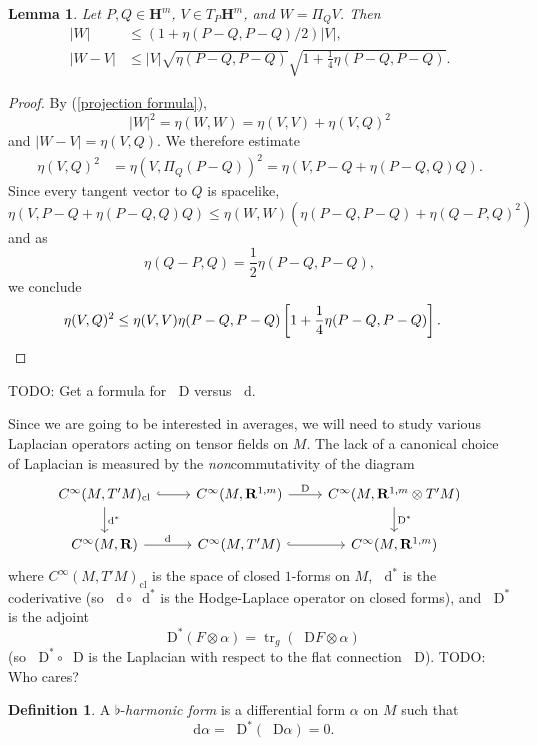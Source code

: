 \documentclass[reqno,12pt,letterpaper]{amsart}
\newcommand{\RR}{\mathbf{R}}
\newcommand{\Hyp}{\mathbf H}
\newcommand{\tr}{\operatorname{tr}}
\newcommand*\dif{\mathop{}\!\mathrm{d}}
\newcommand*\Dif{\mathop{}\!\mathrm{D}}
\newcommand{\dfn}[1]{\emph{#1}\index{#1}}
\newtheorem{lemma}[theorem]{Lemma}
\theoremstyle{definition}
\newtheorem{definition}[theorem]{Definition}
\numberwithin{equation}{section}
\begin{document}
\begin{lemma}
    Let $P, Q \in \Hyp^m$, $V \in T_P\Hyp^m$, and $W = \Pi_Q V$. Then
\begin{align*}
    |W| &\leq (1 + \eta(P - Q, P - Q)/2)|V|, \\
    |W - V| &\leq |V|\sqrt{\eta(P - Q, P - Q)} \sqrt{1 + \frac{1}{4} \eta(P - Q, P - Q)}.
\end{align*}
\end{lemma}
\begin{proof}
By (\ref{projection formula}),
$$|W|^2 = \eta(W, W) = \eta(V, V) + \eta(V, Q)^2$$
and $|W - V| = \eta(V, Q)$.
We therefore estimate 
\begin{align*}
\eta(V, Q)^2 &= \eta(V, \Pi_Q(P - Q))^2 = \eta(V, P - Q + \eta(P - Q, Q)Q).
\end{align*}
Since every tangent vector to $Q$ is spacelike,
$$\eta(V, P - Q + \eta(P - Q, Q)Q) \leq \eta(W, W)(\eta(P - Q, P - Q) + \eta(Q - P, Q)^2)$$
and as 
$$\eta(Q - P, Q) = \frac{1}{2}\eta(P - Q, P - Q),$$
we conclude 
\begin{align*}
\eta(V, Q)^2 &\leq \eta(V, V) \eta(P - Q, P - Q) \left[1 + \frac{1}{4} \eta(P - Q, P - Q)\right]. \qedhere
\end{align*}
\end{proof}

TODO: Get a formula for $\Dif$ versus $\dif$.

Since we are going to be interested in averages, we will need to study various Laplacian operators acting on tensor fields on $M$.
The lack of a canonical choice of Laplacian is measured by the \emph{non}commutativity of the diagram 
$$\begin{tikzcd}
C^\infty(M, T'M)_{\mathrm{cl}} \arrow[hookrightarrow]{r} \arrow["\dif^*"]{d} &
C^\infty(M, \RR^{1, m}) \arrow["\Dif"]{r} &
C^\infty(M, \RR^{1, m} \otimes T'M) \arrow["\Dif^*"]{d} \\
C^\infty(M, \RR) \arrow["\dif"]{r} &
C^\infty(M, T'M) \arrow[hookrightarrow]{r} &
C^\infty(M, \RR^{1, m})
\end{tikzcd}$$
where $C^\infty(M, T'M)_{\mathrm{cl}}$ is the space of closed $1$-forms on $M$, $\dif^*$ is the coderivative (so $\dif \circ \dif^*$ is the Hodge-Laplace operator on closed forms), and $\Dif^*$ is the adjoint
$$\Dif^* (F \otimes \alpha) = \tr_g (\Dif F \otimes \alpha)$$
(so $\Dif^* \circ \Dif$ is the Laplacian with respect to the flat connection $\Dif$).
TODO: Who cares?

\begin{definition}
A $\flat$-\dfn{harmonic form} is a differential form $\alpha$ on $M$ such that
$$\dif \alpha = \Dif^* (\Dif \alpha) = 0.$$
\end{definition}
\end{document}
